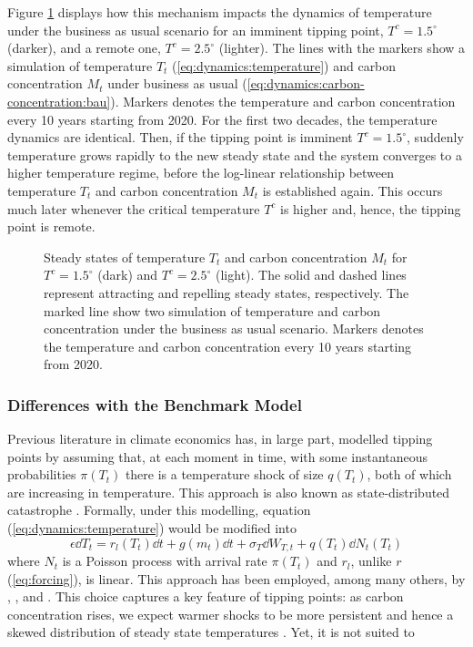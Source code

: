 \documentclass[../../main.tex]{subfiles}
\begin{document}
Figure \ref{fig:nullclines} displays how this mechanism impacts the dynamics of temperature under the business as usual scenario for an imminent tipping point, $T^c = 1.5^\circ$ (darker), and a remote one, $T^c = 2.5^\circ$ (lighter). The lines with the markers show a simulation of temperature $T_t$ (\ref{eq:dynamics:temperature}) and carbon concentration $M_t$ under business as usual (\ref{eq:dynamics:carbon-concentration:bau}). Markers denotes the temperature and carbon concentration every 10 years starting from 2020. For the first two decades, the temperature dynamics are identical. Then, if the tipping point is imminent $T^c = 1.5^\circ$, suddenly temperature grows rapidly to the new steady state and the system converges to a higher temperature regime, before the log-linear relationship between temperature $T_t$ and carbon concentration $M_t$ is established again. This occurs much later whenever the critical temperature $T^c$ is higher and, hence, the tipping point is remote. \begin{figure}[htbp]
    \centering
    
    \caption{Steady states of temperature $T_t$ and carbon concentration $M_t$ for $T^c = 1.5^\circ$ (dark) and $T^c = 2.5^\circ$ (light). The solid and dashed lines represent attracting and repelling steady states, respectively. The marked line show two simulation of temperature and carbon concentration under the business as usual scenario. Markers denotes the temperature and carbon concentration every 10 years starting from 2020.}
    \label{fig:nullclines}
\end{figure}

\subsubsection{Differences with the Benchmark Model}


Previous literature in climate economics has, in large part, modelled tipping points by assuming that, at each moment in time, with some instantaneous probabilities $\pi(T_t)$ there is a temperature shock of size $q(T_t)$, both of which are increasing in temperature. This approach is also known as state-distributed catastrophe \citep{li_economics_2024}. Formally, under this modelling, equation (\ref{eq:dynamics:temperature}) would be modified into \begin{equation} \label{eq:dynamics:temperature:benchmark}
    \epsilon \dd{T}_t = r_l(T_t) \dd{t} + g(m_t) \dd{t} + \sigma_T \dd{W}_{T, t} + q(T_t) \dd{N}_{t}(T_t)
\end{equation} where $N_t$ is a Poisson process with arrival rate $\pi(T_t)$ and $r_l$, unlike $r$ (\ref{eq:forcing}), is linear. This approach has been employed, among many others, by \cite{hambel_optimal_2021}, \cite{van_der_ploeg_climate_2018}, and \cite{lemoine_ambiguous_2016}. This choice captures a key feature of tipping points: as carbon concentration rises, we expect warmer shocks to be more persistent and hence a skewed distribution of steady state temperatures \citep{intergovernmental_panel_on_climate_change_climate_2023}. Yet, it is not suited to 
\end{document}
